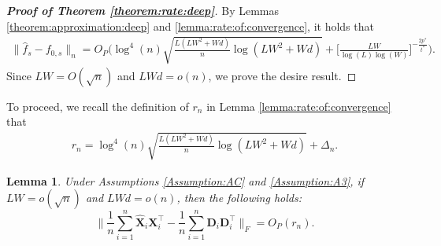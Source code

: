 \documentclass[11pt, preprint]{imsart}
\numberwithin{equation}{section}
\def \bfD{\mathbf{D}}
\def \bfX{\mathbf{X}}
\def \bfD{\mathbf{D}}
\theoremstyle{plain}
\newtheorem{lemma}{\indent Lemma}
\theoremstyle{definition}
\begin{document}
\begin{proof}[\textbf{Proof of Theorem \ref{theorem:rate:deep}}]
By Lemmas \ref{theorem:approximation:deep} and \ref{lemma:rate:of:convergence}, it holds that
\begin{eqnarray}
	\|\widehat{f}_s-f_{0,s}\|_n=O_P\bigg(\log^4(n)\sqrt{\frac{L(LW^2+Wd)}{n}\log(LW^2+Wd)}+\bigg[\frac{LW}{\log(L)\log(W)}\bigg]^{-\frac{2p^*}{t^*}}\bigg).\nonumber
\end{eqnarray}
Since $LW=O(\sqrt{n})$ and $LWd=o(n)$, we prove the desire result.
\end{proof}

To proceed, we recall the definition of $r_n$ in Lemma \ref{lemma:rate:of:convergence} that
\begin{eqnarray}
	r_n=\log^4(n)\sqrt{\frac{L(LW^2+Wd)}{n}\log(LW^2+Wd)}+\Delta_n.\nonumber
\end{eqnarray}
\begin{lemma}\label{lemma:difference:rate:2}
Under Assumptions \ref{Assumption:AC} and \ref{Assumption:A3}, if $LW=o(\sqrt{n})$ and $LWd=o(n)$, then the following holds:
$$\bigg\|\frac{1}{n}\sum_{i=1}^n\widehat{\bfX}_i{\bfX}_i^\top-\frac{1}{n}\sum_{i=1}^n\bfD_i\bfD_i^\top\bigg\|_F=O_P(r_n).$$
\end{lemma}
\end{document}
